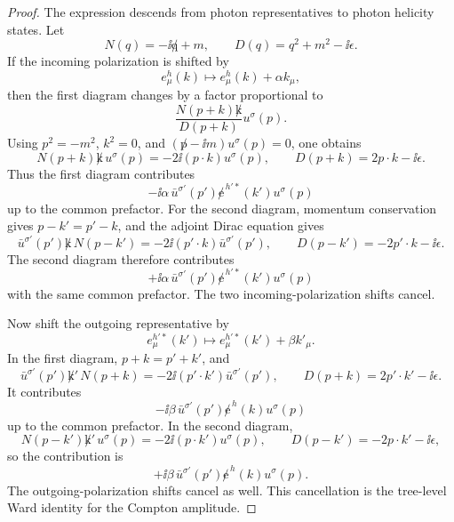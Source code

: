\begin{proof}
The expression descends from photon representatives to photon helicity states.
Let
\[
  N(q)=-\ii\not q+m,\qquad D(q)=q^2+m^2-\ii\epsilon .
\]
If the incoming polarization is shifted by
\[
  e_\mu^h(k)\mapsto e_\mu^h(k)+\alpha k_\mu ,
\]
then the first diagram changes by a factor proportional to
\[
  \frac{N(p+k)\not k}{D(p+k)}u^\sigma(p).
\]
Using \(p^2=-m^2\), \(k^2=0\), and
\((\not p-\ii m)u^\sigma(p)=0\), one obtains
\[
  N(p+k)\not k\,u^\sigma(p)
  =
  -2\ii(p\cdot k)u^\sigma(p),
  \qquad
  D(p+k)=2p\cdot k-\ii\epsilon .
\]
Thus the first diagram contributes
\[
  -\ii\alpha\,
  \bar u^{\sigma'}(p')\not e^{\,h'*}(k')u^\sigma(p)
\]
up to the common prefactor. For the second diagram, momentum conservation
gives \(p-k'=p'-k\), and the adjoint Dirac equation gives
\[
  \bar u^{\sigma'}(p')\not k\,N(p-k')
  =
  -2\ii(p'\cdot k)\bar u^{\sigma'}(p'),
  \qquad
  D(p-k')=-2p'\cdot k-\ii\epsilon .
\]
The second diagram therefore contributes
\[
  +\ii\alpha\,
  \bar u^{\sigma'}(p')\not e^{\,h'*}(k')u^\sigma(p)
\]
with the same common prefactor. The two incoming-polarization shifts cancel.

Now shift the outgoing representative by
\[
  e_\mu^{h'*}(k')\mapsto e_\mu^{h'*}(k')+\beta k'_\mu .
\]
In the first diagram, \(p+k=p'+k'\), and
\[
  \bar u^{\sigma'}(p')\not k'\,N(p+k)
  =
  -2\ii(p'\cdot k')\bar u^{\sigma'}(p'),
  \qquad
  D(p+k)=2p'\cdot k'-\ii\epsilon .
\]
It contributes
\[
  -\ii\beta\,
  \bar u^{\sigma'}(p')\not e^{\,h}(k)u^\sigma(p)
\]
up to the common prefactor. In the second diagram,
\[
  N(p-k')\not k'\,u^\sigma(p)
  =
  -2\ii(p\cdot k')u^\sigma(p),
  \qquad
  D(p-k')=-2p\cdot k'-\ii\epsilon ,
\]
so the contribution is
\[
  +\ii\beta\,
  \bar u^{\sigma'}(p')\not e^{\,h}(k)u^\sigma(p).
\]
The outgoing-polarization shifts cancel as well. This cancellation is the
tree-level Ward identity for the Compton amplitude.
\end{proof}

